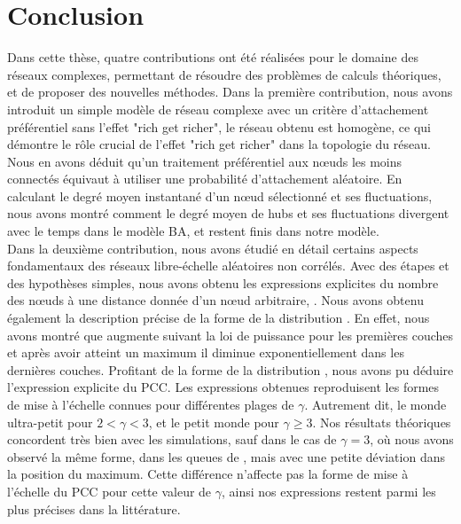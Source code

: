 %
\chapter*{Conclusion}
 


Dans cette thèse, quatre contributions ont été réalisées pour le domaine des réseaux complexes, permettant de résoudre des problèmes de calculs théoriques, et de proposer des nouvelles méthodes. Dans la première contribution, nous avons introduit un simple modèle de réseau complexe avec un critère d'attachement préférentiel sans l'effet "rich get richer", le réseau obtenu est homogène, ce qui démontre le rôle crucial de l'effet "rich get richer" dans la topologie du réseau. Nous en avons déduit qu'un traitement préférentiel aux nœuds les moins connectés équivaut à utiliser une probabilité d'attachement aléatoire. En calculant le degré moyen instantané d'un nœud sélectionné et ses fluctuations, nous avons montré comment le degré moyen de hubs et ses fluctuations divergent avec le temps dans le modèle BA, et restent finis dans notre modèle.\\

Dans la deuxième contribution, nous avons étudié en détail certains aspects fondamentaux des réseaux libre-échelle aléatoires non corrélés. Avec des étapes et des hypothèses simples, nous avons obtenu les expressions explicites du nombre des nœuds à une distance donnée d'un nœud arbitraire, \nl\nolinebreak. Nous avons obtenu également la description précise de la forme de la distribution \nolinebreak. En effet, nous avons montré que \nl augmente suivant la loi de puissance pour les premières couches et après avoir atteint un maximum il diminue exponentiellement dans les dernières couches. Profitant de la forme de la distribution \nl, nous avons pu déduire l'expression explicite du PCC. Les expressions obtenues reproduisent les formes de mise à l'échelle connues pour différentes plages de $\gamma$. Autrement dit, le monde ultra-petit pour $2<\gamma<3$, et le petit monde pour $\gamma\ge 3$. Nos résultats théoriques concordent très bien avec les simulations, sauf dans le cas de $\gamma=3$, où nous avons observé la même forme, dans les queues de \nl, mais avec une petite déviation dans la position du maximum. Cette différence n'affecte pas la forme de mise à l'échelle du PCC pour cette valeur de $\gamma$, ainsi nos expressions restent parmi les plus précises dans la littérature.\\

